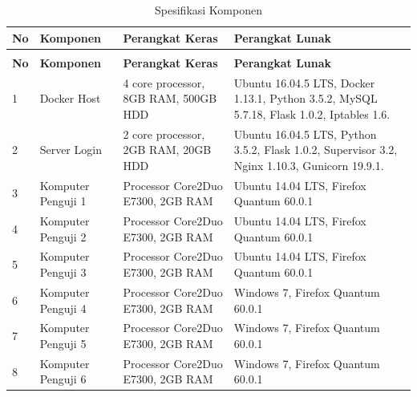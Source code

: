     \begin{longtable}{|p{}|p{}|p{}|p{}|}					\caption{Spesifikasi Komponen} \label{spesifikasikomponen} \\
        \hline
        \textbf{No} & \textbf{Komponen} & \textbf{Perangkat Keras} & \textbf{Perangkat Lunak} \\ \hline
        \endfirsthead
        \caption[]{Spesifikasi Komponen} \\
        \hline
        \textbf{No} & \textbf{Komponen} & \textbf{Perangkat Keras} & \textbf{Perangkat Lunak} \\ \hline
        \endhead
        \endfoot
        \endlastfoot

    	1 & Docker Host & 4 core processor, 8GB RAM, 500GB HDD & Ubuntu 16.04.5 LTS, Docker 1.13.1, Python 3.5.2, MySQL 5.7.18, Flask 1.0.2, Iptables 1.6. \\ \hline
        2 & Server Login & 2 core processor, 2GB RAM, 20GB HDD & Ubuntu 16.04.5 LTS,  Python 3.5.2, Flask 1.0.2, Supervisor 3.2, Nginx 1.10.3, Gunicorn 19.9.1. \\ \hline
        3 & Komputer Penguji 1 & Processor Core2Duo E7300, 2GB RAM & Ubuntu 14.04 LTS, Firefox Quantum 60.0.1 \\ \hline
        4 & Komputer Penguji 2 & Processor Core2Duo E7300, 2GB RAM & Ubuntu 14.04 LTS, Firefox Quantum 60.0.1 \\ \hline
        5 & Komputer Penguji 3 & Processor Core2Duo E7300, 2GB RAM & Ubuntu 14.04 LTS, Firefox Quantum 60.0.1 \\ \hline
        6 & Komputer Penguji 4 & Processor Core2Duo E7300, 2GB RAM & Windows 7, Firefox Quantum 60.0.1 \\ \hline
        7 & Komputer Penguji 5 & Processor Core2Duo E7300, 2GB RAM & Windows 7, Firefox Quantum 60.0.1 \\ \hline
        8 & Komputer Penguji 6 & Processor Core2Duo E7300, 2GB RAM & Windows 7, Firefox Quantum 60.0.1 \\ \hline
    \end{longtable}
    
